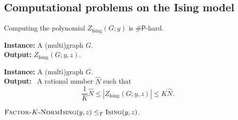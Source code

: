     \subsection{Computational problems on the Ising model}


\begin{frame}
  \begin{proposition}
    Computing the polynomial $Z_{\text{Ising}}(G; y)$ is $\# \mathsf{P}$-hard.
  \end{proposition}

  \begin{comproblem}
  	\textbf{Instance:} A (multi)graph $G$. \\
  	\textbf{Output:} $Z_{\text{Ising}}(G; y, z)$.
  \end{comproblem}

  \begin{comproblem}
  	\textbf{Instance:} A (multi)graph $G$. \\
  	\textbf{Output:} $\,$ A rational number $\hat{N}$ such that
  	\begin{equation*}
  	\frac{1}{K} \hat{N} \le \left| Z_{\text{Ising}}(G; y, z) \right| \le K \hat{N}.
  	\end{equation*}   
  \end{comproblem}

{\color{TurkishRose} $\textsc{Factor-}K \textsc{-NormIsing}(y, z) \le_T \textsc{Ising}(y, z)$.}

	


\end{frame}
